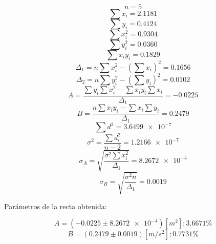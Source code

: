 \documentclass[letter,11pt]{article}
\begin{document}
\begin{equation*}
    n = 5
\end{equation*}
\begin{equation*}
    \sum x_i = 2.1181
\end{equation*}
\begin{equation*}
    \sum y_i = 0.4124
\end{equation*}
\begin{equation*}
    \sum x^2_i = 0.9304
\end{equation*}
\begin{equation*}
    \sum y^2_i = 0.0360
\end{equation*}
\begin{equation*}
    \sum x_i y_i = 0.1829
\end{equation*}
\begin{equation*}
    \Delta_1 = n \sum x^2_i - \left( \sum x_i \right)^2 = 0.1656
\end{equation*}
\begin{equation*}
    \Delta_2 = n \sum y^2_i - \left( \sum y_i \right)^2 = 0.0102
\end{equation*}
\begin{equation*}
    A = \frac{\sum y_i \sum x^2_i - \sum x_i y_i \sum x_i}{\Delta_1} = -0.0225
\end{equation*}
\begin{equation*}
    B = \frac{n \sum x_i y_i - \sum x_i \sum y_i}{\Delta_1} = 0.2479
\end{equation*}
\begin{equation*}
    \sum d^2 = \num{3.6499e-7}
\end{equation*}
\begin{equation*}
    \sigma^2 = \frac{\sum d^2_i}{n-2} = \num{1.2166e-7}
\end{equation*}
\begin{equation*}
    \sigma_A = \sqrt{\frac{\sigma^2 \sum x^2_i}{\Delta_1}} = \num{8.2672e-4}
\end{equation*}
\begin{equation*}
    \sigma_B = \sqrt{\frac{\sigma^2 n}{\Delta_1}} = 0.0019
\end{equation*}
\vspace{0.10cm}

Parámetros de la recta obtenida:

\begin{equation*}
    A = (-0.0225 \pm \num{8.2672e-4}) [m^2]; 3.6671\%
\end{equation*}
\begin{equation*}
    B = (0.2479 \pm 0.0019) [m/s^2]; 0.7731\%
\end{equation*}
\vspace{0.10cm}
\end{document}
